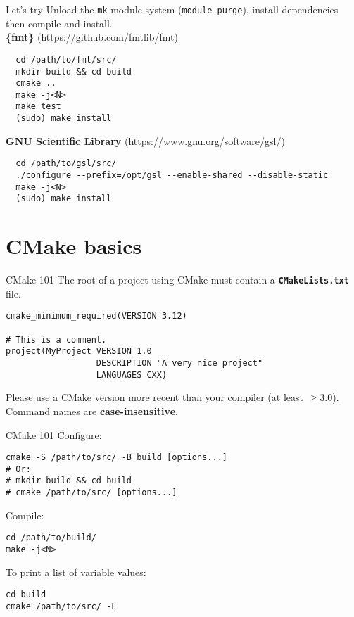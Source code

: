 \documentclass[aspectratio=169,11pt]{beamer}
\begin{document}
\begin{frame}[fragile]{Let's try}
  Unload the \texttt{mk} module system (\texttt{module purge}), install dependencies then compile and install.\\
  \textbf{\{fmt\}} {\small (\url{https://github.com/fmtlib/fmt})}
  \begin{verbatim}
  cd /path/to/fmt/src/
  mkdir build && cd build
  cmake ..
  make -j<N>
  make test
  (sudo) make install
  \end{verbatim}
  \textbf{GNU Scientific Library} {\small (\url{https://www.gnu.org/software/gsl/})}
  \begin{verbatim}
  cd /path/to/gsl/src/
  ./configure --prefix=/opt/gsl --enable-shared --disable-static
  make -j<N>
  (sudo) make install
  \end{verbatim}
\end{frame}

\section{CMake basics}
\begin{frame}[fragile]{CMake 101}
The root of a project using CMake must contain a \textbf{\texttt{CMakeLists.txt}} file.

\begin{verbatim}
cmake_minimum_required(VERSION 3.12)

# This is a comment.
project(MyProject VERSION 1.0
                  DESCRIPTION "A very nice project"
                  LANGUAGES CXX)
\end{verbatim}
Please use a CMake version more recent than your compiler (at least \(\geq 3.0\)).
\vfill
Command names are \textbf{case-insensitive}.
\end{frame}

\begin{frame}[fragile]{CMake 101}
Configure:
\begin{verbatim}
cmake -S /path/to/src/ -B build [options...]
# Or:
# mkdir build && cd build
# cmake /path/to/src/ [options...]
\end{verbatim}
Compile:
\begin{verbatim}
cd /path/to/build/
make -j<N>
\end{verbatim}
To print a list of variable values:
\begin{verbatim}
cd build
cmake /path/to/src/ -L
\end{verbatim}
\end{frame}
\end{document}
